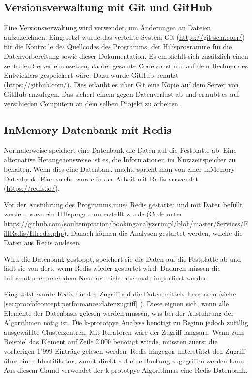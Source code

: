 \subsection{Versionsverwaltung mit Git und GitHub}
Eine Versionsverwaltung wird verwendet, um Änderungen an Dateien aufzuzeichnen. Eingesetzt wurde das verteilte System Git (\url{https://git-scm.com/}) für die Kontrolle des Quellcodes des Programms, der Hilfsprogramme für die Datenvorbereitung sowie dieser Dokumentation. Es empfiehlt sich zusätzlich einen zentralen Server einzusetzen, da der gesamte Code sonst nur auf dem Rechner des Entwicklers gespeichert wäre. Dazu wurde GitHub benutzt (\url{https://github.com/}). Dies erlaubt es über Git eine Kopie auf dem Server von GitHub anzulegen. Das sichert einem gegen Datenverlust ab und erlaubt es auf verschieden Computern an dem selben Projekt zu arbeiten.

\subsection{InMemory Datenbank mit Redis}
\label{sec:proofofconcept:externebibliotheken:redis}
Normalerweise speichert eine Datenbank die Daten auf die Festplatte ab. Eine alternative Herangehensweise ist es, die Informationen im Kurzzeitspeicher zu behalten. Wenn dies eine Datenbank macht, spricht man von einer InMemory Datenbank. Eine solche wurde in der Arbeit mit Redis verwendet (\url{https://redis.io/}).

Vor der Ausführung des Programms muss Redis gestartet und mit Daten befüllt werden, wozu ein Hilfsprogramm erstellt wurde (Code unter \url{https://github.com/soultemptation/bookinganalyzerimpl/blob/master/Services/FillRedis/fillredis.php}). Danach können die Analysen gestartet werden, welche die Daten aus Redis auslesen. 

Wird die Datenbank gestoppt, speichert sie die Daten auf die Festplatte ab und lädt sie von dort, wenn Redis wieder gestartet wird. Dadurch müssen die Informationen nach dem Neustart nicht nochmals importiert werden.

Eingesetzt wurde Redis für den Zugriff auf die Daten mittels Iteratoren (siehe \cref{sec:proofofconcept:performance:datenzugriff} ). Diese eignen sich, wenn alle Elemente der Datenbasis gelesen werden müssen, was bei der Ausführung der Algorithmen nötig ist. Die k-prototpye Analyse benötigt zu Beginn jedoch zufällig ausgewählte Clusterzentren. Mit Iteratoren wäre der Zugriff langsam. Wenn zum Beispiel das Element auf Zeile 2'000 benötigt würde, müssten zuerst die vorherigen 1'999 Einträge gelesen werden. Redis hingegen unterstützt den Zugriff über einen Identifikator, womit direkt auf eine Buchung zugegriffen werden kann. Aus diesem Grund verwendet der k-prototpye Algorithmus eine Redis Datenbank.


